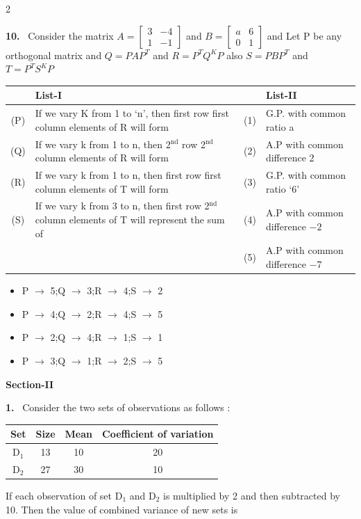 \documentclass[10pt]{extarticle}
\newcommand{\sect}[1]{\par\smallskip\noindent\textbf{#1}\par}
\newcommand{\qn}[1]{\par\smallskip\noindent\textbf{#1.}~}
\newenvironment{qoptions}{\begin{itemize}[leftmargin=1.8em,itemsep=1pt,topsep=2pt,label={}]}{\end{itemize}}
\newcommand{\opt}[2]{\item[(#1)] #2}
\begin{document}
\begin{multicols}{2}
\qn{10} Consider the matrix $A=\begin{bmatrix}3&-4\\1&-1\end{bmatrix}$ and $B=\begin{bmatrix}a&6\\0&1\end{bmatrix}$ and Let P be any orthogonal matrix and $Q=PAP^T$ and $R=P^TQ^KP$ also $S=PBP^T$ and $T=P^TS^KP$
\begin{center}\small\setlength{\tabcolsep}{3pt}
\begin{tabular}{|c|p{2.6cm}|c|p{2.3cm}|}
\hline
 & \centering List-I & & \centering List-II \tabularnewline
\hline
(P) & If we vary K from 1 to `n', then first row first column elements of R will form & (1) & G.P. with common ratio a \\
\hline
(Q) & If we vary k from 1 to n, then 2$^{\text{nd}}$ row 2$^{\text{nd}}$ column elements of R will form & (2) & A.P with common difference 2 \\
\hline
(R) & If we vary k from 1 to n, then first row first column elements of T will form & (3) & G.P. with common ratio `6' \\
\hline
(S) & If we vary k from 3 to n, then first row 2$^{\text{nd}}$ column elements of T will represent the sum of & (4) & A.P with common difference $-2$ \\
\hline
 & & (5) & A.P with common difference $-7$ \\
\hline
\end{tabular}
\end{center}
\begin{qoptions}
\opt{A}{P $\to$ 5;Q $\to$ 3;R $\to$ 4;S $\to$ 2}
\opt{B}{P $\to$ 4;Q $\to$ 2;R $\to$ 4;S $\to$ 5}
\opt{C}{P $\to$ 2;Q $\to$ 4;R $\to$ 1;S $\to$ 1}
\opt{D}{P $\to$ 3;Q $\to$ 1;R $\to$ 2;S $\to$ 5}
\end{qoptions}

\sect{Section-II}

\qn{1} Consider the two sets of observations as follows :
\begin{center}\small\setlength{\tabcolsep}{3pt}
\begin{tabular}{|c|c|c|c|}
\hline
\textbf{Set} & \textbf{Size} & \textbf{Mean} & \textbf{Coefficient of variation} \\
\hline
D$_1$ & 13 & 10 & 20 \\
\hline
D$_2$ & 27 & 30 & 10 \\
\hline
\end{tabular}
\end{center}
If each observation of set D$_1$ and D$_2$ is multiplied by 2 and then subtracted by 10. Then the value of combined variance of new sets is


\end{multicols}
\end{document}
